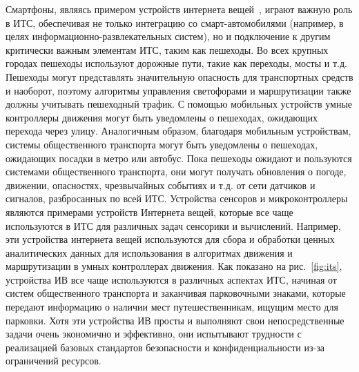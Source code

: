 Смартфоны, являясь примером устройств интернета вещей~\cite{hatim2018vanets}, играют важную роль в ИТС, обеспечивая не только интеграцию со смарт-автомобилями (например, в целях информационно-развлекательных систем), но и подключение к другим критически важным элементам ИТС, таким как пешеходы. Во всех крупных городах пешеходы используют дорожные пути, такие как переходы, мосты и т.д. Пешеходы могут представлять значительную опасность для транспортных средств и наоборот, поэтому алгоритмы управления светофорами и маршрутизации также должны учитывать пешеходный трафик. С помощью мобильных устройств умные контроллеры движения могут быть уведомлены о пешеходах, ожидающих перехода через улицу. Аналогичным образом, благодаря мобильным устройствам, системы общественного транспорта могут быть уведомлены о пешеходах, ожидающих посадки в метро или автобус. Пока пешеходы ожидают и пользуются системами общественного транспорта, они могут получать обновления о погоде, движении, опасностях, чрезвычайных событиях и т.д. от сети датчиков и сигналов, разбросанных по всей ИТС. Устройства сенсоров и микроконтроллеры являются примерами устройств Интернета вещей, которые все чаще используются в ИТС для различных задач сенсорики и вычислений. Например, эти устройства интернета вещей используются для сбора и обработки ценных аналитических данных для использования в алгоритмах движения и маршрутизации в умных контроллерах движения. Как показано на рис.~\ref{fig:its}, устройства ИВ все чаще используются в различных аспектах ИТС, начиная от систем общественного транспорта и заканчивая парковочными знаками, которые передают информацию о наличии мест путешественникам, ищущим место для парковки. Хотя эти устройства ИВ просты и выполняют свои непосредственные задачи очень экономично и эффективно, они испытывают трудности с реализацией базовых стандартов безопасности и конфиденциальности из-за ограничений ресурсов.

\newpage